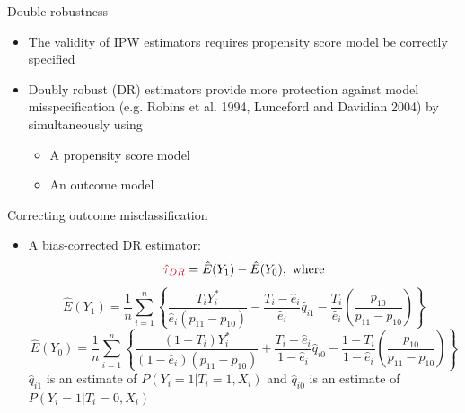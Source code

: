 \documentclass[12pt,aspectratio=169]{beamer}
\begin{document}
\begin{frame}{Double robustness}

\begin{itemize}
\item 
The validity of IPW estimators  requires propensity score model be  correctly specified 

\item Doubly robust (DR) estimators provide more {\color{cred}protection against model misspecification} (e.g. Robins et al. 1994, Lunceford and Davidian 2004) by simultaneously using
\begin{itemize}
\item A propensity score model
\item An outcome model
\end{itemize}
\end{itemize}
\vfill
{\color{black!40}{\scriptsize Robins JM, Rotnitzky A, Zhao LP. Estimation of regression coefficients when some regressors are not always observed. Am Stat Assoc 1994;89(427):846-66.}}

{\color{black!40}{\scriptsize Lunceford JK, Davidian M. Stratification and weighting via the propensity score in estimation of causal treatment effects: a comparative study. Stat Med 2004;23(19):2937-60.}}

\end{frame}







\begin{frame}{Correcting outcome misclassification}

\begin{itemize}

 \item
 A  {\color{cred}bias-corrected} DR estimator:
 \[
{\color{cred}\hat\tau_{DR}}=\hat E(Y_1)-\hat E(Y_0),\,\,\text{where}
\]
{\small
\[
\hat E(Y_1)=\dfrac{1}{n}\sum_{i=1}^n \left\{\dfrac{T_iY_i^\ast}{\hat e_i(p_{11}-p_{10})}-\dfrac{T_i-\hat e_i}{\hat e_i}\hat q_{i1}-\dfrac{T_i}{\hat e_i}\left(\dfrac{p_{10}}{p_{11}-p_{10}}\right)\right\}
\]
\[
\hat E(Y_0)=\dfrac{1}{n}\sum_{i=1}^n \left\{\dfrac{(1-T_i)Y_i^\ast}{(1-\hat e_i)(p_{11}-p_{10})}+\dfrac{T_i-\hat e_i}{1-\hat e_i}\hat q_{i0}-\dfrac{1-T_i}{1-\hat e_i}\left(\dfrac{p_{10}}{p_{11}-p_{10}}\right)\right\}
\]
}
 $\hat q_{i1}$ is an estimate of $P(Y_i=1|T_i=1, X_i)$ and  $\hat q_{i0}$ is an estimate of $P(Y_i=1|T_i=0, X_i)$


\end{itemize}

\end{frame}
\end{document}
